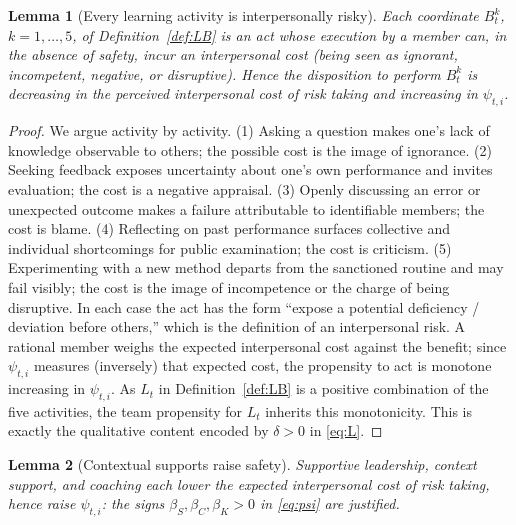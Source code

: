 \documentclass{amsart}
\newtheorem{lemma}{Lemma}
\theoremstyle{definition}
\theoremstyle{remark}
\begin{document}
\begin{lemma}[Every learning activity is interpersonally risky]\label{lem:risk}
Each coordinate $B_t^k$, $k=1,\dots,5$, of Definition~\ref{def:LB} is an
act whose execution by a member can, in the absence of safety, incur an
interpersonal cost (being seen as ignorant, incompetent, negative, or
disruptive). Hence the disposition to perform $B_t^k$ is decreasing in the
\emph{perceived} interpersonal cost of risk taking and increasing in
$\psi_{t,i}$.
\end{lemma}

\begin{proof}
We argue activity by activity. (1) Asking a question makes one's lack of
knowledge observable to others; the possible cost is the image of
ignorance. (2) Seeking feedback exposes uncertainty about one's own
performance and invites evaluation; the cost is a negative appraisal. (3)
Openly discussing an error or unexpected outcome makes a failure
attributable to identifiable members; the cost is blame. (4) Reflecting on
past performance surfaces collective and individual shortcomings for
public examination; the cost is criticism. (5) Experimenting with a new
method departs from the sanctioned routine and may fail visibly; the cost
is the image of incompetence or the charge of being disruptive. In each
case the act has the form ``expose a potential deficiency / deviation
before others,'' which is the definition of an interpersonal risk. A
rational member weighs the expected interpersonal cost against the benefit;
since $\psi_{t,i}$ measures (inversely) that expected cost, the propensity
to act is monotone increasing in $\psi_{t,i}$. As $L_t$ in
Definition~\ref{def:LB} is a positive combination of the five activities,
the team propensity for $L_t$ inherits this monotonicity. This is exactly
the qualitative content encoded by $\delta>0$ in \eqref{eq:L}.
\end{proof}

\begin{lemma}[Contextual supports raise safety]\label{lem:supports}
Supportive leadership, context support, and coaching each lower the
expected interpersonal cost of risk taking, hence raise $\psi_{t,i}$:
the signs $\beta_S,\beta_C,\beta_K>0$ in \eqref{eq:psi} are justified.
\end{lemma}
\end{document}

